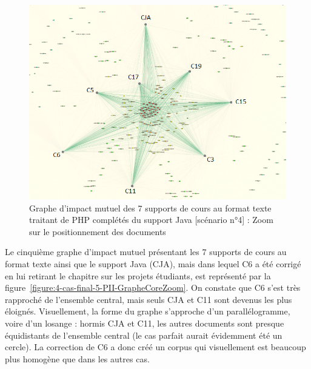 \begin{figure}[htb!]
\centering
\centerline{  %
\includegraphics[scale=0.75]{4-Experiences/images/cas-final/4-Full-Text-PHP+Java_core-courses-written.png}
}
\caption{Graphe d'impact mutuel des 7 supports de cours au format texte traitant de PHP complétés du support Java [scénario n°4] : Zoom sur le positionnement des documents}
\label{figure:4-cas-final-4-PII-GrapheCoreZoom}
\end{figure}

\hspace{0pt}
\vfill

\clearpage

Le cinquième graphe d'impact mutuel présentant les 7 supports de cours au format texte ainsi que le support Java (CJA), mais dans lequel C6 a été corrigé en lui retirant le chapitre sur les projets étudiants, est représenté par la figure~\ref{figure:4-cas-final-5-PII-GrapheCoreZoom}.
On constate que C6 s'est très rapproché de l'ensemble central, mais seuls CJA et C11 sont devenus les plus éloignés.
Visuellement, la forme du graphe s'approche d'un parallélogramme, voire d'un losange : hormis CJA et C11, les autres documents sont presque équidistants de l'ensemble central (le cas parfait aurait évidemment été un cercle).
La correction de C6 a donc créé un corpus qui visuellement est beaucoup plus homogène que dans les autres cas.

\vfill
\hspace{0pt}

